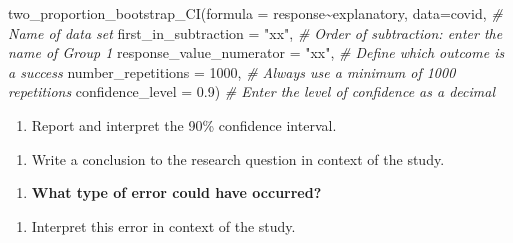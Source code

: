 \documentclass[
]{report}
\newenvironment{Shaded}{\begin{snugshade}}{\end{snugshade}}
\newcommand{\AttributeTok}[1]{\textcolor[rgb]{0.77,0.63,0.00}{#1}}
\newcommand{\CommentTok}[1]{\textcolor[rgb]{0.56,0.35,0.01}{\textit{#1}}}
\newcommand{\DecValTok}[1]{\textcolor[rgb]{0.00,0.00,0.81}{#1}}
\newcommand{\FloatTok}[1]{\textcolor[rgb]{0.00,0.00,0.81}{#1}}
\newcommand{\FunctionTok}[1]{\textcolor[rgb]{0.00,0.00,0.00}{#1}}
\newcommand{\NormalTok}[1]{#1}
\newcommand{\SpecialCharTok}[1]{\textcolor[rgb]{0.00,0.00,0.00}{#1}}
\newcommand{\StringTok}[1]{\textcolor[rgb]{0.31,0.60,0.02}{#1}}
\providecommand{\tightlist}{%
  \setlength{\itemsep}{0pt}\setlength{\parskip}{0pt}}
\begin{document}
\begin{Shaded}
\begin{Highlighting}[]
\FunctionTok{two\_proportion\_bootstrap\_CI}\NormalTok{(}\AttributeTok{formula =}\NormalTok{ response}\SpecialCharTok{\textasciitilde{}}\NormalTok{explanatory, }
        \AttributeTok{data=}\NormalTok{covid, }\CommentTok{\# Name of data set}
        \AttributeTok{first\_in\_subtraction =} \StringTok{"xx"}\NormalTok{, }\CommentTok{\# Order of subtraction: enter the name of Group 1}
        \AttributeTok{response\_value\_numerator =} \StringTok{"xx"}\NormalTok{, }\CommentTok{\# Define which outcome is a success }
        \AttributeTok{number\_repetitions =} \DecValTok{1000}\NormalTok{, }\CommentTok{\# Always use a minimum of 1000 repetitions}
        \AttributeTok{confidence\_level =} \FloatTok{0.9}\NormalTok{) }\CommentTok{\# Enter the level of confidence as a decimal}
\end{Highlighting}
\end{Shaded}

\begin{enumerate}
\def\labelenumi{\arabic{enumi}.}
\setcounter{enumi}{11}
\tightlist
\item
  Report and interpret the 90\% confidence interval.
\end{enumerate}

\vspace{0.8in}

\begin{enumerate}
\def\labelenumi{\arabic{enumi}.}
\setcounter{enumi}{12}
\tightlist
\item
  Write a conclusion to the research question in context of the study.
\end{enumerate}

\vspace{0.8in}

\begin{enumerate}
\def\labelenumi{\arabic{enumi}.}
\setcounter{enumi}{13}
\tightlist
\item
  \textbf{What type of error could have occurred?}
\end{enumerate}

\vspace{0.2in}

\begin{enumerate}
\def\labelenumi{\arabic{enumi}.}
\setcounter{enumi}{14}
\tightlist
\item
  Interpret this error in context of the study.
\end{enumerate}
\end{document}

